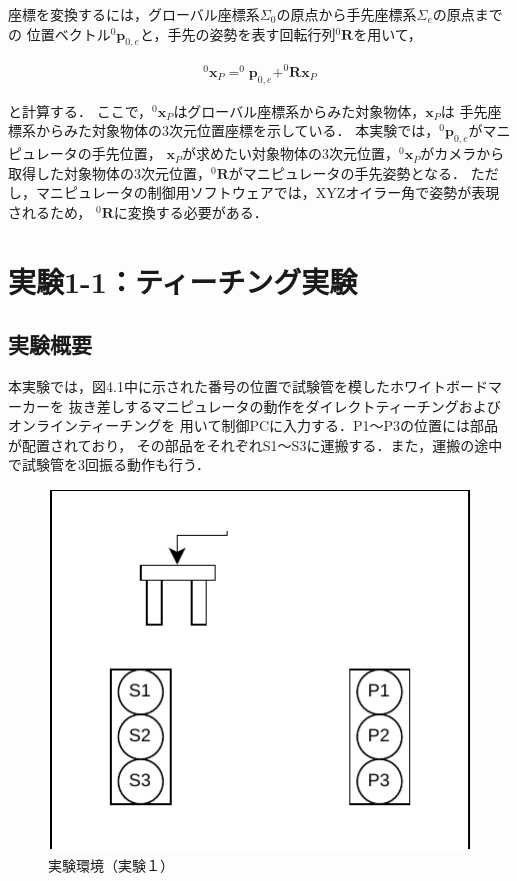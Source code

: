 座標を変換するには，グローバル座標系$\Sigma_0$の原点から手先座標系$\Sigma_e$の原点までの
位置ベクトル$^0\mathbf{p}_{0,e}$と，手先の姿勢を表す回転行列$^0\mathbf{R}$を用いて，

\begin{align}
  ^0\mathbf{x}_{P} = ^0\mathbf{p}_{0,e} + ^0\mathbf{R} \mathbf{x}_{P} \tag{3.1}
\end{align}

と計算する．
ここで，$^0\mathbf{x}_{P}$はグローバル座標系からみた対象物体，$\mathbf{x}_{P}$は
手先座標系からみた対象物体の3次元位置座標を示している．
本実験では，$^0\mathbf{p}_{0,e}$がマニピュレータの手先位置，
$\mathbf{x}_{P}$が求めたい対象物体の3次元位置，$^0\mathbf{x}_{P}$がカメラから
取得した対象物体の3次元位置，$^0\mathbf{R}$がマニピュレータの手先姿勢となる．
ただし，マニピュレータの制御用ソフトウェアでは，XYZオイラー角で姿勢が表現されるため，
$^0\mathbf{R}$に変換する必要がある．


\section{実験1-1：ティーチング実験}

\subsection{実験概要}
本実験では，図4.1中に示された番号の位置で試験管を模したホワイトボードマーカーを
抜き差しするマニピュレータの動作をダイレクトティーチングおよびオンラインティーチングを
用いて制御PCに入力する．P1～P3の位置には部品が配置されており，
その部品をそれぞれS1～S3に運搬する．また，運搬の途中で試験管を3回振る動作も行う．

\begin{figure}[h]
  \centering
  \includegraphics[scale=0.6]{sozai/2.pdf}
  \caption{実験環境（実験１）}
\end{figure}

